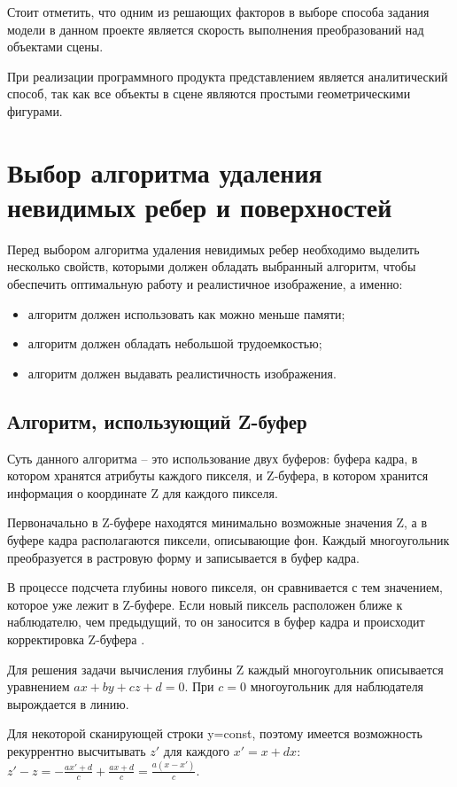 Стоит отметить, что одним из решающих факторов в выборе способа задания модели в данном проекте является скорость выполнения преобразований над объектами сцены.

При реализации программного продукта представлением является аналитический способ, так как все объекты в сцене являются простыми геометрическими фигурами.

\section{Выбор алгоритма удаления невидимых ребер и поверхностей}

Перед выбором алгоритма удаления невидимых ребер необходимо выделить несколько свойств, которыми должен обладать выбранный алгоритм, чтобы обеспечить оптимальную работу и реалистичное изображение, а именно:

\begin{itemize}
	\item	алгоритм должен использовать как можно меньше памяти;
	\item	алгоритм должен обладать небольшой трудоемкостью;
	\item	алгоритм должен выдавать реалистичность изображения.
\end{itemize}


\subsection{Алгоритм, использующий Z-буфер}
Суть данного алгоритма – это использование двух буферов: буфера кадра, в котором хранятся атрибуты каждого пикселя, и Z-буфера, в котором хранится информация о координате Z для каждого пикселя.

Первоначально в Z-буфере находятся минимально возможные значения Z, а в буфере кадра располагаются пиксели, описывающие фон. Каждый многоугольник преобразуется в растровую форму и записывается в буфер кадра.

В процессе подсчета глубины нового пикселя, он сравнивается с тем значением, которое уже лежит в Z-буфере. Если новый пиксель расположен ближе к наблюдателю, чем предыдущий, то он заносится в буфер кадра и происходит корректировка Z-буфера \cite{zbufer}.

Для решения задачи вычисления глубины Z каждый многоугольник описывается уравнением $ax+by+cz+d=0$. При $c=0$ многоугольник для наблюдателя вырождается в линию. 

Для некоторой сканирующей строки y=const, поэтому имеется возможность рекуррентно высчитывать $z'$ для каждого $x'=x+dx$: $z' - z = - \frac{ax' + d}{c} + \frac{ax + d}{c} = \frac{a(x - x')}{c}$.


